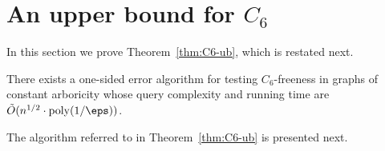 \section{An upper bound for $C_6$}\label{sec:C6-ub}
In this section we prove Theorem~\ref{thm:C6-ub}, which is restated next.

\begin{theorem}\label{thm:C6-ub}
There exists a one-sided error algorithm for testing $C_6$-freeness in graphs of constant arboricity  whose query complexity and running time are $\tilde{O}(n^{1/2}\cdot {\rm poly}(1/\eps))$.
\end{theorem}

The algorithm referred to in Theorem~\ref{thm:C6-ub} is presented next.


